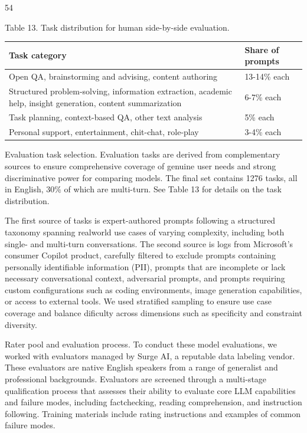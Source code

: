 \documentclass[
  10
]{article}
\newcounter{none} %
\begin{document}
54

Table 13. Task distribution for human side-by-side evaluation.

{\def\LTcaptype{none} %
\begin{longtable}[]{@{}|l|l|@{}}
\toprule\noalign{}
\endhead
\bottomrule\noalign{}
\endlastfoot
\hline
Task category & Share of prompts \\
\hline
Open QA, brainstorming and advising, content authoring & 13-14\% each \\
\hline
Structured problem-solving, information extraction, academic help,
insight generation, content summarization & 6-7\% each \\
\hline
Task planning, context-based QA, other text analysis & 5\% each \\
\hline
Personal support, entertainment, chit-chat, role-play & 3-4\% each \\
\hline
\end{longtable}
}

Evaluation task selection. Evaluation tasks are derived from
complementary sources to ensure comprehensive coverage of genuine user
needs and strong discriminative power for comparing models. The final
set contains 1276 tasks, all in English, 30\% of which are multi-turn.
See Table 13 for details on the task distribution.

The first source of tasks is expert-authored prompts following a
structured taxonomy spanning realworld use cases of varying complexity,
including both single- and multi-turn conversations. The second source
is logs from Microsoft's consumer Copilot product, carefully filtered to
exclude prompts containing personally identifiable information (PII),
prompts that are incomplete or lack necessary conversational context,
adversarial prompts, and prompts requiring custom configurations such as
coding environments, image generation capabilities, or access to
external tools. We used stratified sampling to ensure use case coverage
and balance dificulty across dimensions such as specificity and
constraint diversity.

Rater pool and evaluation process. To conduct these model evaluations,
we worked with evaluators managed by Surge AI, a reputable data labeling
vendor. These evaluators are native English speakers from a range of
generalist and professional backgrounds. Evaluators are screened through
a multi-stage qualification process that assesses their ability to
evaluate core LLM capabilities and failure modes, including
factchecking, reading comprehension, and instruction following. Training
materials include rating instructions and examples of common failure
modes.
\end{document}
